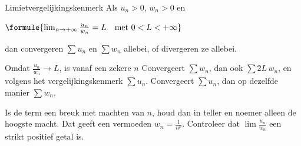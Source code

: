 \begin{theorie}
\begin{stelling}{Limietvergelijkingskenmerk}
Als $u_n > 0$, $w_n > 0$ en

\vspace{1mm}
\qquad $\formule{\lim_{n\to+\infty} \frac{u_n}{w_n} = L \quad \text{met } 0 < L < +\infty}$

\vspace{1mm}
dan convergeren $\sum u_n$ en $\sum w_n$ allebei, of divergeren ze allebei.
\end{stelling}

\begin{bewijs}
Omdat $\tfrac{u_n}{w_n} \to L$, is vanaf een zekere $n$
Convergeert $\sum w_n$, dan ook $\sum 2L\,w_n$, en volgens het vergelijkingskenmerk $\sum u_n$. Convergeert $\sum u_n$, dan op dezelfde manier $\sum w_n$.
\end{bewijs}
\end{theorie}


\begin{werkwijze}
Is de term een breuk met machten van $n$, houd dan in teller en noemer alleen de hoogste macht. Dat geeft een vermoeden $w_n = \tfrac{1}{n^p}$. Controleer dat $\lim \tfrac{u_n}{w_n}$ een strikt positief getal is.
\end{werkwijze}


\begin{oefeningen}
\end{oefeningen}

